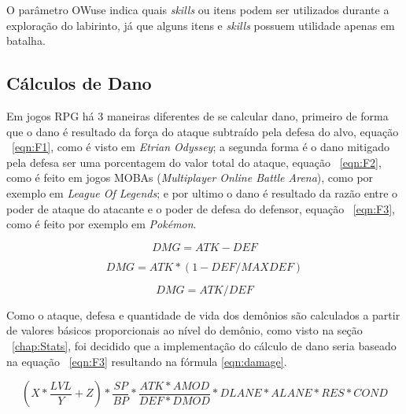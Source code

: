 \documentclass[
	12pt,				%
	openright,			%
	twoside,			%
	a4paper,			%
	english,			%
	french,				%
	spanish,			%
	brazil				%
	]{abntex2}
\begin{document}
	O parâmetro OWuse indica quais \emph{skills} ou itens podem ser utilizados durante a exploração do labirinto, já que alguns itens e \emph{skills} possuem utilidade apenas em batalha.

\subsection{Cálculos de Dano}

	Em jogos RPG há 3 maneiras diferentes de se calcular dano, primeiro de forma que o dano é resultado da força do ataque subtraído pela defesa do alvo, equação ~\ref{eqn:F1}, como é visto em \emph{Etrian Odyssey}; a segunda forma é o dano mitigado pela defesa ser uma porcentagem do valor total do ataque, equação ~\ref{eqn:F2}, como é feito em jogos MOBAs (\emph{Multiplayer Online Battle Arena}), como por exemplo em \emph{League Of Legends}; e por ultimo o dano é resultado da razão entre o poder de ataque do atacante e o poder de defesa do defensor, equação ~\ref{eqn:F3}, como é feito por exemplo em \emph{Pokémon}.
	
\begin{equation}
\label{eqn:F1}
DMG = ATK - DEF
\end{equation}

\begin{equation}
\label{eqn:F2}
DMG = ATK * (1 - DEF/MAXDEF)
\end{equation}

\begin{equation}
\label{eqn:F3}
DMG = ATK / DEF
\end{equation}

	Como o ataque, defesa e quantidade de vida dos demônios são calculados a partir de valores básicos proporcionais ao nível do demônio, como visto na seção ~\ref{chap:Stats}, foi decidido que a implementação do cálculo de dano seria baseado na equação ~\ref{eqn:F3} resultando na fórmula \ref{eqn:damage}.

\begin{equation}
\label{eqn:damage}
(X*\frac{LVL}{Y} + Z) * \frac{SP}{BP} * \frac{ATK*AMOD}{DEF*DMOD} * DLANE * ALANE * RES * COND
\end{equation}
\end{document}

